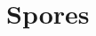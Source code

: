 \documentclass[runningheads]{llncs}
\begin{document}
\begin{sloppypar}





\section{Spores}
\label{sec:spores}




\end{sloppypar}
\end{document}
